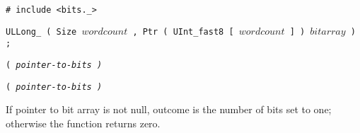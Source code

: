 
\tt{# include <bits._>}

\tt{ULLong_} \s\s\tt{( Size} $wordcount$
\tt{, Ptr ( UInt_fast8 [} $wordcount$ \tt{] )} $bitarray$ \tt{) ;}

\s\s
\tt{(} \it{pointer-to-bits} \tt{)}

\s\s\s
\tt{(} \it{pointer-to-bits} \tt{)}


If pointer to bit array is not null, outcome is the number of bits set to one;
otherwise the function returns zero.
